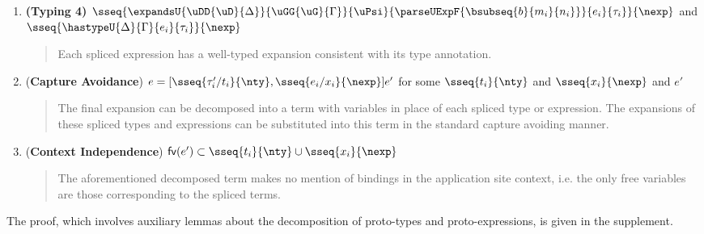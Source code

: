 \documentclass[acmlarge,review,anonymous]{acmart}\settopmatter{printfolios=true}
\begin{document}
\begin{theorem}
\begin{enumerate}[nolistsep]
\begin{quote}
    \end{quote}
\item \textbf{(Typing 4)} $\sseq{
  \expandsU
    {\uDD{\uD}{\Delta}}
    {\uGG{\uG}{\Gamma}}
    {\uPsi}
    {\parseUExpF{\bsubseq{b}{m_i}{n_i}}}
    {e_i}
    {\tau_i}
}{\nexp}$ and $\sseq{\hastypeU{\Delta}{\Gamma}{e_i}{\tau_i}}{\nexp}$
    \begin{quote}
      Each spliced expression has a well-typed expansion consistent with its type annotation.
    \end{quote}
\item (\textbf{Capture Avoidance}) $e = [\sseq{\tau'_i/t_i}{\nty}, \sseq{e_i/x_i}{\nexp}]e'$ for some $\sseq{t_i}{\nty}$ and $\sseq{x_i}{\nexp}$ and $e'$
    \begin{quote}
      The final expansion can be decomposed into a  term with variables in place of each spliced type or expression. The expansions of these spliced types and expressions can be substituted into this term in the standard capture avoiding manner.
    \end{quote}
\item (\textbf{Context Independence}) $\mathsf{fv}(e') \subset \sseq{t_i}{\nty} \cup \sseq{x_i}{\nexp}$
    \begin{quote}
      The aforementioned decomposed term makes no mention of bindings in the application site context, i.e. the only free variables are those corresponding to the spliced terms.
    \end{quote}
\end{enumerate}
\end{theorem}
The proof, which involves auxiliary lemmas about the decomposition of proto-types and proto-expressions, is given in the supplement.
\end{document}
